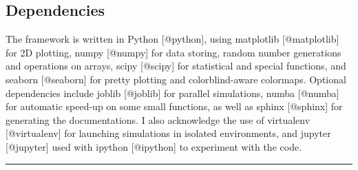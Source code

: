 \hypertarget{dependencies}{%
\subsection{Dependencies}\label{dependencies}}

The framework is written in Python {[}@python{]}, using matplotlib
{[}@matplotlib{]} for 2D plotting, numpy {[}@numpy{]} for data storing,
random number generations and operations on arrays, scipy
{[}@scipy{]} for statistical and special functions, and seaborn
{[}@seaborn{]} for pretty plotting and colorblind-aware colormaps.
Optional dependencies include joblib {[}@joblib{]} for parallel
simulations, numba {[}@numba{]} for automatic speed-up on some small
functions, as well as sphinx {[}@sphinx{]} for generating the
documentations. I also acknowledge the use of virtualenv
{[}@virtualenv{]} for launching simulations in isolated environments,
and jupyter {[}@jupyter{]} used with ipython {[}@ipython{]} to
experiment with the code.

\begin{center}\rule{0.5\linewidth}{\linethickness}\end{center}
